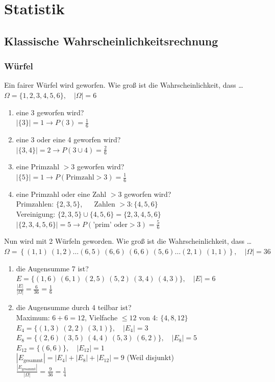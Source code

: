 \documentclass[11pt, a4paper]{article}
\newcommand{\abs}[1]{\left\lvert#1\right\rvert}
\begin{document}
\newpage
\section{Statistik}
\subsection{Klassische Wahrscheinlichkeitsrechnung}
\subsubsection{Würfel}
Ein fairer Würfel wird geworfen. Wie groß ist die Wahrscheinlichkeit, dass \dots \\
$\Omega = \{1,2,3,4,5,6\}, \quad \abs{\Omega} = 6$
\begin{enumerate}
	\item eine 3 geworfen wird? \\
	$\abs{\{3\}} = 1 \rightarrow P(3) = \frac{1}{6}$
	\item eine 3 oder eine 4 geworfen wird? \\
	$\abs{\{3, 4\}} = 2 \rightarrow P(3 \cup 4) = \frac{2}{6}$
	\item eine Primzahl $> 3$ geworfen wird? \\
	$\abs{\{5\}} = 1 \rightarrow P(\text{Primzahl} > 3) = \frac{1}{6}$
	\item eine Primzahl oder eine Zahl $> 3$ geworfen wird? \\
	Primzahlen: $\{2,3,5\}$, $\quad$ Zahlen $> 3: \{4,5,6\}$ \\
	Vereinigung: $\{2,3,5\} \cup \{4,5,6\} = \{2,3,4,5,6\}$ \\
	$\abs{\{2,3,4,5,6\}} = 5 \rightarrow P(\text{'prim' oder} >3) = \frac{5}{6}$
\end{enumerate}
Nun wird mit 2 Würfeln geworden. Wie groß ist die Wahrscheinlichkeit, dass \dots \\
$\Omega = \left\{(1,1)\ (1,2)\dots (6,5)\ (6,6)\ (6,6)\ (5,6)\dots (2,1)\ (1,1)\right\}, \quad \abs{\Omega} = 36$
\begin{enumerate}
	\item die Augensumme 7 ist? \\
	$E = \{(1,6)\ (6,1)\ (2,5)\ (5,2)\ (3,4)\ (4,3)\}, \quad \abs{E} = 6$ \\
	$\frac{\abs{E}}{\abs{\Omega}} = \frac{6}{36} = \frac{1}{6}$
	\item die Augensumme durch 4 teilbar ist? \\
	Maximum: $6+6 = 12$, Vielfache $\leq 12$ von 4: $\{4, 8, 12\}$ \\
	$E_4 = \{(1,3)\ (2,2)\ (3,1)\}, \quad \abs{E_4} = 3$ \\
	$E_8 = \{(2,6)\ (3,5)\ (4,4)\ (5,3)\ (6,2)\}, \quad \abs{E_8} = 5$ \\
	$E_{12} = \{(6,6)\}, \quad \abs{E_{12}} = 1$ \\
	$\abs{E_{\text{gesammt}}} = \abs{E_4} + \abs{E_8} + \abs{E_{12}} = 9$ (Weil disjunkt) \\
	$\frac{\abs{E_{\text{gesammt}}}}{\abs{\Omega}} = \frac{9}{36} = \frac{1}{4}$
\end{enumerate}
\end{document}
